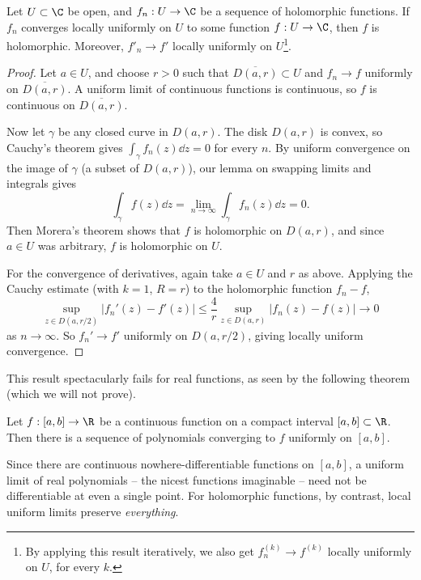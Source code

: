 \begin{theorem}
    Let $U \subset \C$ be open, and $f_n: U \rightarrow \C$ be a sequence of holomorphic functions. If $f_n$ converges locally uniformly on $U$ to some function $f: U \rightarrow \C$, then $f$ is holomorphic. Moreover, $f'_n \rightarrow f'$ locally uniformly on $U$\footnote{By applying this result iteratively, we also get $f_n^{(k)} \rightarrow f^{(k)}$ locally uniformly on $U$, for every $k$.}.
\end{theorem}
\begin{proof}
    Let $a \in U$, and choose $r > 0$ such that $\overline{D(a, r)} \subset U$ and $f_n \rightarrow f$ uniformly on $\overline{D(a, r)}$. A uniform limit of continuous functions is continuous, so $f$ is continuous on $\overline{D(a, r)}$.

    Now let $\gamma$ be any closed curve in $D(a, r)$. The disk $D(a, r)$ is convex, so Cauchy's theorem gives $\int_\gamma f_n(z) \dd z = 0$ for every $n$. By uniform convergence on the image of $\gamma$ (a subset of $D(a,r)$), our lemma on swapping limits and integrals gives
    $$
    \int_\gamma f(z) \dd z = \lim_{n \to \infty} \int_\gamma f_n(z) \dd z = 0.
    $$
    Then Morera's theorem shows that $f$ is holomorphic on $D(a, r)$, and since $a \in U$ was arbitrary, $f$ is holomorphic on $U$.

    For the convergence of derivatives, again take $a \in U$ and $r$ as above. Applying the Cauchy estimate (with $k = 1$, $R = r$) to the holomorphic function $f_n - f$,
    $$
    \sup_{z \in D(a, r/2)} |f_n'(z) - f'(z)| \leq \frac{4}{r} \sup_{z \in D(a, r)} |f_n(z) - f(z)| \rightarrow 0
    $$
    as $n \rightarrow \infty$. So $f_n' \rightarrow f'$ uniformly on $D(a, r/2)$, giving locally uniform convergence.
\end{proof}

This result spectacularly fails for real functions, as seen by the following theorem (which we will not prove).

\begin{theorem}
    Let $f: [a, b] \rightarrow \R$ be a continuous function on a compact interval $[a, b] \subset \R$. Then there is a sequence of polynomials converging to $f$ uniformly on $[a, b]$.
\end{theorem}

Since there are continuous nowhere-differentiable functions on $[a, b]$, a uniform limit of real polynomials -- the nicest functions imaginable -- need not be differentiable at even a single point. For holomorphic functions, by contrast, local uniform limits preserve \emph{everything}.

